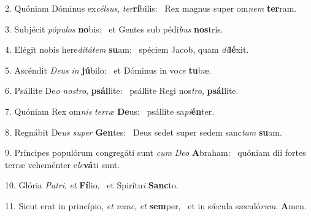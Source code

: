 2. Quóniam Dóminus ex\textit{cél}\textit{sus}, \textit{ter}\textbf{rí}bilis: \ast\  Rex magnus super om\textit{nem} \textbf{ter}ram.\

3. Subjécit \textit{pó}\textit{pu}\textit{los} \textbf{no}bis: \ast\  et Gentes sub pédi\textit{bus} \textbf{nos}tris.\

4. Elégit nobis here\textit{di}\textit{tá}\textit{tem} \textbf{su}am: \ast\  spéciem Jacob, quam \textit{di}\textbf{lé}xit.\

5. Ascéndit \textit{De}\textit{us} \textit{in} \textbf{jú}bilo: \ast\  et Dóminus in vo\textit{ce} \textbf{tu}bæ.\

6. Psállite De\textit{o} \textit{nos}\textit{tro}, \textbf{psál}lite: \ast\  psállite Regi nos\textit{tro}, \textbf{psál}lite.\

7. Quóniam Rex om\textit{nis} \textit{ter}\textit{ræ} \textbf{De}us: \ast\  psállite sa\textit{pi}\textbf{én}ter.\

8. Regnábit De\textit{us} \textit{su}\textit{per} \textbf{Gen}tes: \ast\  Deus sedet super sedem sanc\textit{tam} \textbf{su}am.\

9. Príncipes populórum congregáti sunt \textit{cum} \textit{De}\textit{o} \textbf{A}braham: \ast\  quóniam dii fortes terræ veheménter e\textit{le}\textbf{vá}ti sunt.\

10. Glória \textit{Pa}\textit{tri}, \textit{et} \textbf{Fí}lio, \ast\  et Spirítu\textit{i} \textbf{Sanc}to.\

11. Sicut erat in princípio, \textit{et} \textit{nunc}, \textit{et} \textbf{sem}per, \ast\  et in sǽcula sæculó\textit{rum}. \textbf{A}men.\

